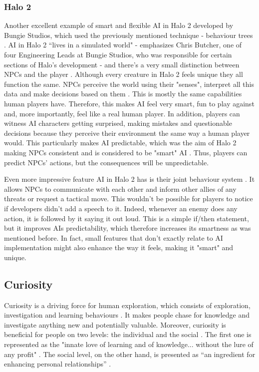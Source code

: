 \documentclass[journal]{IEEEtran}
\begin{document}
\subsubsection{Halo 2} %
Another excellent example of smart and flexible AI in Halo 2 developed by Bungie Studios, which used the previously mentioned technique - behaviour trees \cite{behaviourtreeofhalo2}. AI in Halo 2 ``lives in a simulated world" \cite{halo2} - emphasizes Chris Butcher, one of four Engineering Leads at Bungie Studios, who was responsible for certain sections of Halo's development - and there's a very small distinction between NPCs and the player \cite{halo2}. Although every creature in Halo 2 feels unique they all function the same. NPCs perceive the world using their "senses", interpret all this data and make decisions based on them \cite{halo2}. This is mostly the same capabilities human players have. Therefore, this makes AI feel very smart, fun to play against and, more importantly, feel like a real human player. In addition, players can witness AI characters getting surprised, making mistakes and questionable decisions \cite{halo2} because they perceive their environment the same way a human player would. This particularly makes AI predictable, which was the aim of Halo 2 making NPCs consistent \cite{halo2} and is considered to be "smart" AI \cite{gamemakertoolkit}. Thus, players can predict NPCs' actions, but the consequences will be unpredictable.

Even more impressive feature AI in Halo 2 has is their joint behaviour system \cite{halo2}. It allows NPCs to communicate with each other and inform other allies of any threats or request a tactical move. This wouldn't be possible for players to notice if developers didn't add a speech to it. Indeed, whenever an enemy does any action, it is followed by it saying it out loud. This is a simple if/then statement, but it improves AIs predictability, which therefore increases its smartness as was mentioned before. In fact, small features that don't exactly relate to AI implementation might also enhance the way it feels, making it "smart" and unique.

\subsection{Curiosity} %
Curiosity is a driving force for human exploration, which consists of exploration, investigation and learning behaviours \cite{wu2013curiosity}\cite{kashdan2004curiosity}. It makes people chase for knowledge and investigate anything new and potentially valuable. Moreover, curiosity is beneficial for people on two levels: the individual and the social \cite{kashdan2010curiosity}. The first one is represented as the "innate love of learning and of knowledge... without the lure of any profit" \cite{loewenstein1994psychology}. The social level, on the other hand, is presented as ``an ingredient for enhancing personal relationships'' \cite{wu2013curiosity}.
\end{document}
